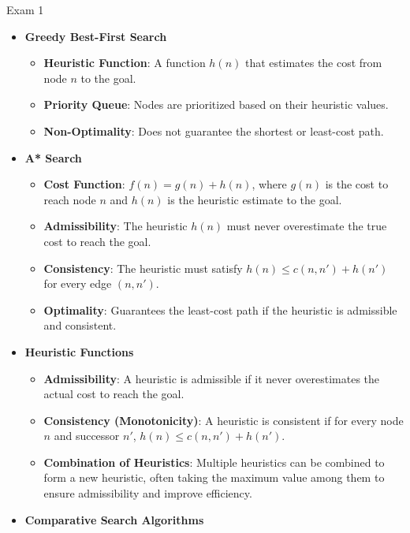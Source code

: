 \begin{examnotes}{Exam 1}
\begin{highlight}
        \begin{itemize}
            \item \textbf{Greedy Best-First Search}
                \begin{itemize}
                    \item \textbf{Heuristic Function}: A function $h(n)$ that estimates the cost from node $n$ to the goal.
                    \item \textbf{Priority Queue}: Nodes are prioritized based on their heuristic values.
                    \item \textbf{Non-Optimality}: Does not guarantee the shortest or least-cost path.
                \end{itemize}
            \item \textbf{A* Search}
                \begin{itemize}
                    \item \textbf{Cost Function}: $f(n) = g(n) + h(n)$, where $g(n)$ is the cost to reach node $n$ and $h(n)$ is the heuristic estimate to the goal.
                    \item \textbf{Admissibility}: The heuristic $h(n)$ must never overestimate the true cost to reach the goal.
                    \item \textbf{Consistency}: The heuristic must satisfy $h(n) \leq c(n, n') + h(n')$ for every edge $(n, n')$.
                    \item \textbf{Optimality}: Guarantees the least-cost path if the heuristic is admissible and consistent.
                \end{itemize}
            \item \textbf{Heuristic Functions}
                \begin{itemize}
                    \item \textbf{Admissibility}: A heuristic is admissible if it never overestimates the actual cost to reach the goal.
                    \item \textbf{Consistency (Monotonicity)}: A heuristic is consistent if for every node $n$ and successor $n'$, $h(n) \leq c(n, n') + h(n')$.
                    \item \textbf{Combination of Heuristics}: Multiple heuristics can be combined to form a new heuristic, often taking the maximum value among them to ensure admissibility and improve efficiency.
                \end{itemize}
            \item \textbf{Comparative Search Algorithms}

\end{itemize}
\end{highlight}
\end{examnotes}
